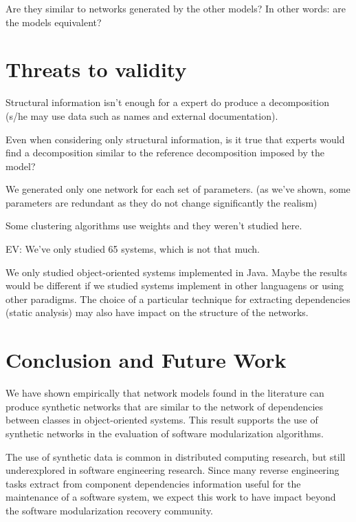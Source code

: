 Are they similar to networks generated by the other models? In other words: are
the models equivalent?

\section{Threats to validity}

Structural information isn't enough for a expert do produce a
decomposition (s/he may use data such as names and external documentation). 

Even when considering only structural information, is it true
that experts would find a decomposition similar to the reference decomposition
imposed by the model?

We generated only one network for each set of parameters. (as we've shown, some
parameters are redundant as they do not change significantly the realism)

Some clustering algorithms use weights and they weren't studied here.

EV: We've only studied 65 systems, which is not that much.

We only studied object-oriented systems implemented in Java. Maybe the results
would be different if we studied systems implement in other languagens or using
other paradigms. The choice of a particular technique for extracting
dependencies (static analysis) may also have impact on the structure of the
networks.


\section{Conclusion and Future Work}

We have shown empirically that network models found in the literature can
produce synthetic networks that are similar to the network of dependencies
between classes in object-oriented systems. This result supports the use of
synthetic networks in the evaluation of software modularization algorithms.

The use of synthetic data is common in distributed computing research, but still
underexplored in software engineering research. Since many reverse engineering
tasks extract from component dependencies information useful for the maintenance
of a software system, we expect this work to have impact beyond the software
modularization recovery community.

